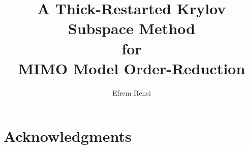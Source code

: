 \documentclass[letterpaper,notitlepage,11pt]{report}
\newcommand{\mytitle}{A Thick-Restarted Krylov Subspace Method \\ for \\ MIMO Model Order-Reduction}
\renewcommand{\thepage}{\roman{page}}%
\begin{document}
 \author{Efrem Rensi}
\title{\mytitle}



\doublespacing 
\clearpage



\singlespacing
\tableofcontents
\clearpage

\doublespacing
\section*{Acknowledgments}

\clearpage

\renewcommand{\thepage}{\arabic{page}}%
\setcounter{page}{1}%


\singlespacing


\end{document}
